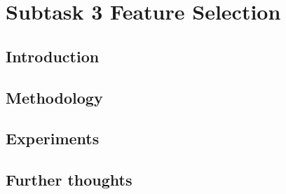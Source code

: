 \documentclass{article}
\begin{document}
\section{Subtask 3 Feature Selection}

\subsection{Introduction}

\subsection{Methodology}

\subsection{Experiments}

\subsection{Further thoughts}
\end{document}
